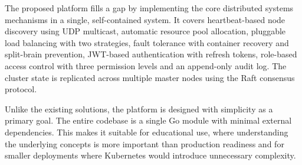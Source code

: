 The proposed platform fills a gap by implementing the core distributed systems mechanisms in a single, self-contained system. It covers heartbeat-based node discovery using UDP multicast, automatic resource pool allocation, pluggable load balancing with two strategies, fault tolerance with container recovery and split-brain prevention, JWT-based authentication with refresh tokens, role-based access control with three permission levels and an append-only audit log. The cluster state is replicated across multiple master nodes using the Raft consensus protocol.

Unlike the existing solutions, the platform is designed with simplicity as a primary goal. The entire codebase is a single Go module with minimal external dependencies. This makes it suitable for educational use, where understanding the underlying concepts is more important than production readiness and for smaller deployments where Kubernetes would introduce unnecessary complexity.